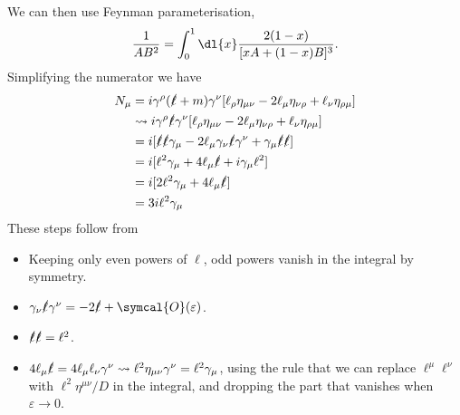 \documentclass[fleqn]{NotesClass}
\newcommand{\order}{\symcal{O}}
\newcommand{\minkowskiMetric}{\eta}
\begin{document}
    We can then use Feynman parameterisation,
    \begin{equation}
        \frac{1}{AB^2} = \int_0^1 \dl{x} \frac{2(1 - x)}{[xA + (1 - x)B]^3}.
    \end{equation}
    Simplifying the numerator we have
    \begin{align}
        N_\mu &= i\gamma^\rho(\slashed{\ell} + m)\gamma^\nu[\ell_\rho \minkowskiMetric_{\mu\nu} - 2\ell_\mu\minkowskiMetric_{\nu\rho} + \ell_\nu\minkowskiMetric_{\rho\mu}]\\
        &\rightsquigarrow i\gamma^\rho\slashed{\ell}\gamma^\nu[\ell_\rho\minkowskiMetric_{\mu\nu} - 2\ell_\mu\minkowskiMetric_{\nu\rho} + \ell_\nu\minkowskiMetric_{\rho\mu}]\\
        &= i[\slashed{\ell}\slashed{\ell}\gamma_\mu - 2\ell_\mu \gamma_\nu\slashed{\ell}\gamma^\nu + \gamma_\mu\slashed{\ell}\slashed{\ell}]\\
        &= i[\ell^2\gamma_\mu + 4\ell_\mu\slashed{\ell} + i\gamma_\mu \ell^2]\\
        &= i[2\ell^2\gamma_\mu + 4\ell_\mu\slashed{\ell}]\\
        &= 3i\ell^2\gamma_\mu
    \end{align}
    These steps follow from
    \begin{itemize}
        \item Keeping only even powers of \(\ell\), odd powers vanish in the integral by symmetry.
        \item \(\gamma_\nu\slashed{\ell}\gamma^\nu = -2\slashed{\ell} + \order(\varepsilon)\).
        \item \(\slashed{\ell}\slashed{\ell} = \ell^2\).
        \item \(4\ell_\mu\slashed{\ell} = 4\ell_\mu\ell_\nu \gamma^\nu \rightsquigarrow \ell^2 \minkowskiMetric_{\mu\nu} \gamma^\nu = \ell^2\gamma_\mu\), using the rule that we can replace \(\ell^\mu \ell^\nu\) with \(\ell^2 \minkowskiMetric^{\mu\nu}/D\) in the integral, and dropping the part that vanishes when \(\varepsilon \to 0\).
    \end{itemize}
    
\end{document}
